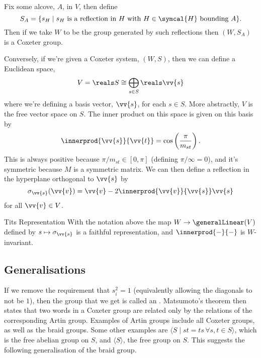 \documentclass[fleqn]{NotesClass}
\newcommand{\isomorphic}{\cong}
\begin{document}
    Fix some alcove, \(A\), in \(V\), then define
    \begin{equation}
        S_A = \{s_H \mid s_H \text{ is a reflection in } H \text{ with } H \in \symcal{H} \text{ bounding } A\}.
    \end{equation}
    Then if we take \(W\) to be the group generated by such reflections then \((W, S_A)\) is a Coxeter group.
    
    Conversely, if we're given a Coxeter system, \((W, S)\), then we can define a Euclidean space,
    \begin{equation}
        V = \reals S \isomorphic \bigoplus_{s \in S} \reals \vv{s}
    \end{equation}
    where we're defining a basis vector, \(\vv{s}\), for each \(s \in S\).
    More abstractly, \(V\) is the free vector space on \(S\).
    The inner product on this space is given on this basis by
    \begin{equation}
        \innerprod{\vv{s}}{\vv{t}} = \cos\left( \frac{\pi}{m_{st}} \right).
    \end{equation}
    This is always positive because \(\pi / m_{st} \in [0, \pi]\) (defining \(\pi/\infty = 0\)), and it's symmetric because \(M\) is a symmetric matrix.
    We can then define a reflection in the hyperplane orthogonal to \(\vv{s}\) by
    \begin{equation}
        \sigma_{\vv{s}}(\vv{v}) = \vv{v} - 2\innerprod{\vv{v}}{\vv{s}} \vv{s}
    \end{equation}
    for all \(\vv{v} \in V\).
    
    \begin{prp}{Tits Representation}{}
        With the notation above the map \(W \to \generalLinear(V)\) defined by \(s \mapsto \sigma_{\vv{s}}\) is a faithful representation, and \(\innerprod{-}{-}\) is \(W\)-invariant.
    \end{prp}
    
    \subsection{Generalisations}
    If we remove the requirement that \(s_i^2 = 1\) (equivalently allowing the diagonals to not be \(1\)), then the group that we get is called an .
    Matsumoto's theorem then states that two words in a Coxeter group are related only by the relations of the corresponding Artin group.
    Examples of Artin groups include all Coxeter groups, as well as the braid groups.
    Some other examples are \(\langle S \mid st = ts\, \forall s, t \in S\rangle\), which is the free abelian group on \(S\), and \(\langle S \rangle\), the free group on \(S\).
    This suggests the following generalisation of the braid group.
    
\end{document}
